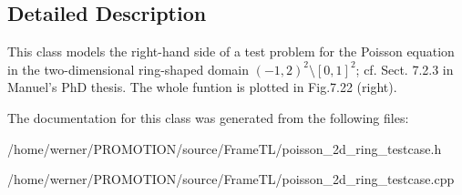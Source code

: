 \subsection{Detailed Description}
This class models the right-hand side of a test problem for the Poisson equation in the two-dimensional ring-shaped domain $(-1,2)^2\setminus [0,1]^2$; cf. Sect. 7.2.3 in Manuel's PhD thesis. The whole funtion is plotted in Fig.7.22 (right). 

The documentation for this class was generated from the following files:\begin{CompactItemize}
\item 
/home/werner/PROMOTION/source/FrameTL/poisson\_\-2d\_\-ring\_\-testcase.h\item 
/home/werner/PROMOTION/source/FrameTL/poisson\_\-2d\_\-ring\_\-testcase.cpp\end{CompactItemize}
